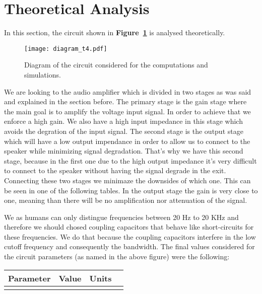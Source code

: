\section{Theoretical Analysis}
\label{sec:analysis}

In this section, the circuit shown in \textbf{Figure~\ref{fig:diagram_t4}} is analysed
theoretically.
\begin{figure}[h] \centering
\texttt{[image: diagram\_t4.pdf]}
\vspace{-7cm}
\caption{Diagram of the circuit considered for the computations and simulations.}
\label{fig:diagram_t4}
\end{figure}

We are looking to the audio amplifier which is divided in two stages as was said and explained in the section before. The primary stage is the gain stage where the main goal is to amplify the voltage input signal. In order to achieve that we enforce a high gain. We also have a high input impedance in this stage which avoids the degration of the input signal. The second stage is the output stage which will have a low output impendance in order to allow us to connect to the speaker while minimizing signal degradation. That's why we have this second stage, because in the first one due to the high output impedance it's very difficult to connect to the speaker without having the signal degrade in the exit. Connecting these two stages we minimaze the downsides of which one. This can be seen in one of the following tables. In the output stage the gain is very close to one, meaning than there will be no amplification nor attenuation of the signal.\par  


We as humans can only distingue frequencies between 20 Hz to 20 KHz and therefore we should chosed coupling capacitors that behave like short-circuits for these frequencies. We do that because the coupling capacitors interfere in the low cutoff frequency and consequently the bandwidth. The final values considered for the circuit parameters (as named in the above figure) were the following:

\hfill
 \parbox{1\linewidth}{
  \centering
  \begin{tabular}{|l|l|l|r|}
    \hline    
    {\bf Parameter} & {\bf Value} & {\bf Units }\\ \hline
    
  \label{tab:params}
  \end{tabular}
  }
\par

